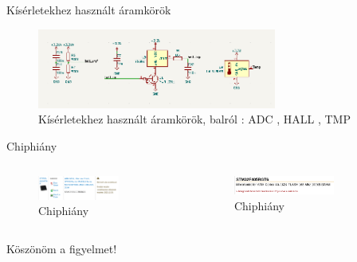 \documentclass[aspectratio=169,xcolor=dvipsnames]{beamer}
\begin{document}
\begin{frame}{Kísérletekhez használt áramkörök}

	\begin{figure}[h]
		\centering
		\includegraphics[width=0.7\textwidth]{kiserletek}
		\caption{Kísérletekhez használt áramkörök, balról : ADC , HALL , TMP}
		\end{figure}

	\end{frame}

\begin{frame}{Chiphiány}
	\begin{columns}[c]
	\begin{enumerate}

			\begin{figure}[h]
				\centering
			\includegraphics[width=0.7\textwidth]{chip1}
				\caption{Chiphiány}
			\end{figure}

	\end{enumerate}
		\begin{figure}[h]
		\centering
			\includegraphics[width=0.7\textwidth]{chip2}
			
		\caption{Chiphiány}
		\end{figure}
	\end{columns}

\end{frame}




\begin{frame}
    \Huge{\centerline{Köszönöm a figyelmet!}}
\end{frame}
\end{document}
